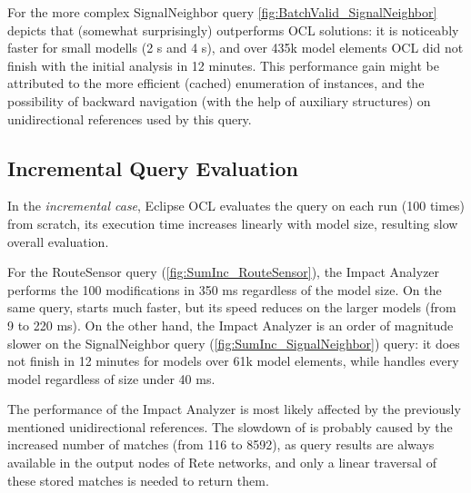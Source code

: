 

For the more complex \textsf{SignalNeighbor} query
\autoref{fig:BatchValid_SignalNeighbor} depicts that \incquery{} (somewhat
surprisingly) outperforms OCL solutions: it is noticeably faster for small
modells (2 s and 4 s), and over 435k model elements OCL did not finish with
the initial analysis in 12 minutes. This performance gain might be attributed to
the more efficient (cached) enumeration of instances, and the possibility of
backward navigation (with the help of auxiliary structures) on unidirectional
references used by this query.

\subsection{Incremental Query Evaluation}
In the \emph{incremental case}, Eclipse OCL evaluates the query on each run
(100 times) from scratch, its execution time increases linearly with
model size, resulting slow overall evaluation.

For the \textsf{RouteSensor} query (\autoref{fig:SumInc_RouteSensor}), the Impact
Analyzer performs the 100 modifications in 350 ms regardless of the model
size. On the same query, \incquery{} starts much faster, but its speed reduces
on the larger models (from 9 to 220 ms). On the other hand, the Impact
Analyzer is an order of magnitude slower on the \textsf{SignalNeighbor} query
(\autoref{fig:SumInc_SignalNeighbor}) query: it does not finish in 12 minutes
for models over 61k model elements, while \incquery{} handles every model
regardless of size under 40 ms.

The performance of the Impact Analyzer is most likely affected by the previously
mentioned unidirectional references. The slowdown of \incquery{} is probably
caused by the increased number of matches (from 116 to 8592), as query
results are always available in the output nodes of Rete networks, and only a
linear traversal of these stored matches is needed to return them.

